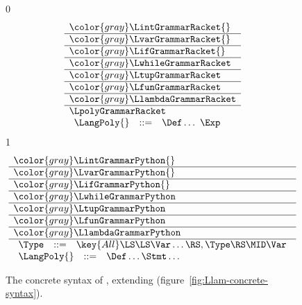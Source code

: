\documentclass[7x10]{TimesAPriori_MIT}%
\newcommand{\gray}[1]{{\color{gray} #1}}
\def\racketEd{0}
\def\pythonEd{1}
\providecommand{\BookEdition}{1}
\let\edition\BookEdition
\newcommand{\pythonColor}[0]{}
\numberwithin{theorem}{chapter}
\numberwithin{definition}{chapter}
\numberwithin{equation}{chapter}
\begin{document}
\newcommand{\LpolyGrammarPython}{
\begin{array}{lcl}
  \Type &::=& \key{All}\LS \LS\Var\ldots\RS,\Type\RS \MID \Var 
\end{array}
}

\newcommand{\LpolyASTPython}{
\begin{array}{lcl}
  \Type &::=& \key{AllType}\LP\LS\Var\ldots\RS, \Type\RP
    \MID \key{GenericVar}\LP\Var\RP
\end{array}
}  


\begin{figure}[tp]
\centering
\begin{tcolorbox}[colback=white]
\footnotesize
{\if\edition\racketEd
\[
\begin{array}{l}
  \gray{\LintGrammarRacket{}} \\ \hline
  \gray{\LvarGrammarRacket{}} \\ \hline
  \gray{\LifGrammarRacket{}} \\ \hline
  \gray{\LwhileGrammarRacket} \\ \hline
  \gray{\LtupGrammarRacket} \\   \hline
  \gray{\LfunGrammarRacket} \\   \hline
  \gray{\LlambdaGrammarRacket} \\ \hline
  \LpolyGrammarRacket \\
\begin{array}{lcl}
  \LangPoly{} &::=& \Def \ldots ~ \Exp
\end{array}
\end{array}
\]
\fi}
{\if\edition\pythonEd\pythonColor
\[
\begin{array}{l}
  \gray{\LintGrammarPython{}} \\ \hline
  \gray{\LvarGrammarPython{}} \\ \hline
  \gray{\LifGrammarPython{}} \\ \hline
  \gray{\LwhileGrammarPython} \\ \hline
  \gray{\LtupGrammarPython} \\   \hline
  \gray{\LfunGrammarPython} \\   \hline
  \gray{\LlambdaGrammarPython} \\\hline
  \LpolyGrammarPython \\
  \begin{array}{lcl}
    \LangPoly{} &::=& \Def\ldots \Stmt\ldots
  \end{array}
\end{array}
\]
\fi}
\end{tcolorbox}

\caption{The concrete syntax of \LangPoly{}, extending \LangLam{}
    (figure~\ref{fig:Llam-concrete-syntax}).}
\label{fig:Lpoly-concrete-syntax}
\end{figure}
\end{document}
